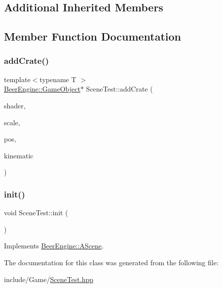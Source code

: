 \subsection*{Additional Inherited Members}


\subsection{Member Function Documentation}
\mbox{\label{class_scene_test_a29d4ffbd6a5035a4d62e9e59b311f791}} 
\subsubsection{\texorpdfstring{add\+Crate()}{addCrate()}}
{\footnotesize\ttfamily template$<$typename T $>$ \\
\mbox{\hyperlink{class_beer_engine_1_1_game_object}{Beer\+Engine\+::\+Game\+Object}}$\ast$ Scene\+Test\+::add\+Crate (\begin{DoxyParamCaption}\item[{\mbox{\hyperlink{class_beer_engine_1_1_graphics_1_1_shader_program}{Beer\+Engine\+::\+Graphics\+::\+Shader\+Program}} $\ast$}]{shader,  }\item[{glm\+::vec3}]{scale,  }\item[{glm\+::vec3}]{pos,  }\item[{\mbox{\hyperlink{namespace_beer_engine_1_1_component_a2cfe279cc309b6420e792597940b8a33}{Beer\+Engine\+::\+Component\+::\+R\+B\+Type}}}]{kinematic }\end{DoxyParamCaption})}

\mbox{\label{class_scene_test_aedded03410798c3705fb3fb028e56ab5}} 
\subsubsection{\texorpdfstring{init()}{init()}}
{\footnotesize\ttfamily void Scene\+Test\+::init (\begin{DoxyParamCaption}\item[{void}]{ }\end{DoxyParamCaption})\hspace{0.3cm}{\ttfamily [virtual]}}



Implements \mbox{\hyperlink{class_beer_engine_1_1_a_scene_a7a55b4e506ae618e6596ae812ad48db0}{Beer\+Engine\+::\+A\+Scene}}.



The documentation for this class was generated from the following file\+:\begin{DoxyCompactItemize}
\item 
include/\+Game/\mbox{\hyperlink{_scene_test_8hpp}{Scene\+Test.\+hpp}}\end{DoxyCompactItemize}
